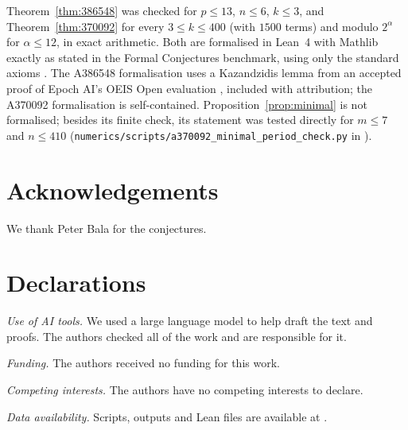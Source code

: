\documentclass[11pt]{amsart}
\begin{document}
Theorem~\ref{thm:386548} was checked for $p\le13$, $n\le6$, $k\le3$, and Theorem~\ref{thm:370092} for every $3\le k\le400$ (with $1500$ terms) and modulo $2^\alpha$ for $\alpha\le12$, in exact arithmetic. Both are formalised in Lean~4 with Mathlib exactly as stated in the Formal Conjectures benchmark, using only the standard axioms \cite{repo}. The A386548 formalisation uses a Kazandzidis lemma from an accepted proof of Epoch AI's OEIS Open evaluation \cite{adamczewski2026,epoch}, included with attribution; the A370092 formalisation is self-contained. Proposition~\ref{prop:minimal} is not formalised; besides its finite check, its statement was tested directly for $m\le7$ and $n\le410$ (\texttt{numerics/scripts/a370092\_minimal\_period\_check.py} in \cite{repo}).

\section*{Acknowledgements}
We thank Peter Bala for the conjectures.

\section*{Declarations}
\emph{Use of AI tools.} We used a large language model to help draft the text and proofs. The authors checked all of the work and are responsible for it.

\emph{Funding.} The authors received no funding for this work.

\emph{Competing interests.} The authors have no competing interests to declare.

\emph{Data availability.} Scripts, outputs and Lean files are available at \cite{repo}.



\end{document}
